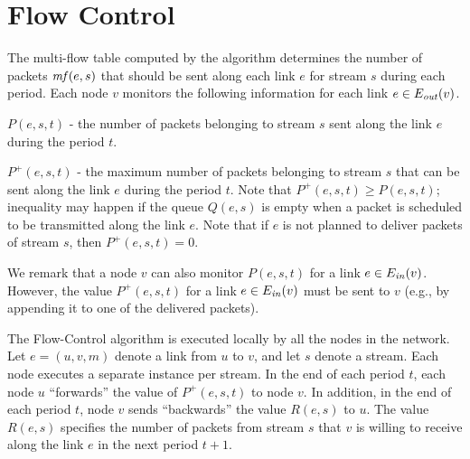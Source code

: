 \documentclass[11pt]{article}
\newenvironment{proof sketch}[1]{\noindent {\emph{Proof sketch of #1:}}}{\hfill \qed}
\newcommand{\mf}{\text{\emph{mf}}}
\newcommand{\Ein}{E_{\text{\emph{in}}}}
\newcommand{\Eout}{E_{\text{\emph{out}}}}
\begin{document}
\section{Flow Control}\label{sec:flow control}
The multi-flow table computed by the algorithm determines the number
of packets $\mf(e,s)$ that should be sent along each link $e$ for
stream $s$ during each period.  Each node $v$ monitors the following
information for each link $e \in \Eout (v)$.
\begin{inparaenum}[(1)]%
\item $P(e,s,t)$ - the number of packets belonging to stream $s$ sent
  along the link $e$ during the period $t$.
\item $P^+(e,s,t)$ - the maximum number of packets belonging to stream
  $s$ that can be sent along the link $e$ during the period $t$. Note
  that $P^+(e,s,t)\geq P(e,s,t)$; inequality may happen if the queue
  $Q(e,s)$ is empty when a packet is scheduled to be transmitted along
  the link $e$. Note that if $e$ is not planned to deliver packets of
  stream $s$, then $P^+(e,s,t)=0$.
\end{inparaenum}%
We remark that a node $v$ can also monitor $P(e,s,t)$ for a link $e\in
\Ein(v)$.  However, the value $P^+(e,s,t)$ for a link $e\in \Ein(v)$
must be sent to $v$ (e.g., by appending it to one of the delivered
packets).

The Flow-Control algorithm is executed locally by all the nodes in the
network. Let $e=(u,v,m)$ denote a link from $u$ to $v$, and let $s$
denote a stream. Each node executes a separate instance per stream.
In the end of each period $t$, each node $u$ ``forwards'' the value of
$P^+(e,s,t)$ to node $v$.  In addition, in the end of each period $t$,
node $v$ sends ``backwards'' the value $R(e,s)$ to $u$. The value
$R(e,s)$ specifies the number of packets from stream $s$ that $v$ is
willing to receive along the link $e$ in the next period $t+1$.
\end{document}
